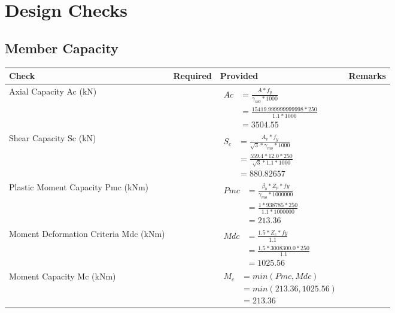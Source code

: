 \documentclass{article}%
\begin{document}
%
%
\newpage%
\section{Design Checks}%
\label{sec:DesignChecks}%
\subsection{Member Capacity}%
\label{subsec:MemberCapacity}%
\renewcommand{\arraystretch}{1.2}%
\begin{longtable}{|p{4cm}|p{5cm}|p{5.5cm}|p{1.5cm}|}%
\hline%
\rowcolor{OsdagGreen}%
Check&Required&Provided&Remarks\\%
\hline%
\endhead%
\hline%
Axial Capacity Ac (kN)&&$\begin{aligned} Ac &=\frac{A*f_y}{\gamma_{m0} *1000}\\ &=\frac{15419.999999999998*250}{1.1* 1000}\\ &=3504.55\end{aligned}$&\\%
\hline%
Shear Capacity Sc (kN)&&$\begin{aligned} S_c &= \frac{A_v*f_y}{\sqrt{3}*\gamma_{mo} *1000}\\ &=\frac{559.4*12.0*250}{\sqrt{3}*1.1 *1000}\\ &=880.82657\end{aligned}$&\\%
\hline%
Plastic Moment Capacity Pmc (kNm)&&$\begin{aligned} Pmc &= \frac{\beta_b * Z_p *fy}{\gamma_{mo} * 1000000}\\ &=\frac{1*938785*250}{1.1 * 1000000}\\ &=213.36\end{aligned}$&\\%
\hline%
Moment Deformation Criteria Mdc (kNm)&&$\begin{aligned} Mdc &= \frac{1.5 *Z_e *fy}{1.1}\\ &= \frac{1.5 *3008300.0*250}{1.1}\\ &= 1025.56\end{aligned}$&\\%
\hline%
Moment Capacity Mc (kNm)&&$\begin{aligned} M_c &= min(Pmc,Mdc)\\ &=min(213.36,1025.56)\\ &=213.36\end{aligned}$&\\%
\hline%
\end{longtable}
\end{document}
